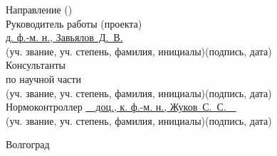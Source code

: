 \begin{titlepage}
\begin{flushleft}
	Направление ()\\
	Руководитель работы (проекта)\\
	\underline{д. ф.-м. н., Завьялов~Д.~В.}\hfill\underline{\hspace{5cm}}\\
	\vspace{-.2cm}\hspace{.4cm}\footnotesize(уч. звание, уч. степень, фамилия, 
		инициалы)\hspace{6.5cm}(подпись, дата)\normalsize\\
	Консультанты\\
	по научной части \underline{\hspace{7cm}}\hfill\underline{\hspace{5cm}}\\
	\vspace{-.2cm}\hspace{4cm}\footnotesize(уч. звание, уч. степень, фамилия, 
		инициалы)\hspace{3cm}(подпись, дата)\normalsize\\
	Нормоконтроллер \underline{\ \ доц., к. ф.-м. н., Жуков~С.~С.\ \ }\hfill
		\underline{\hspace{5cm}}\\
	\vspace{-.2cm}\hspace{4cm}\footnotesize(уч. звание, уч. степень, фамилия, 
		инициалы)\hspace{3cm}(подпись, дата)\normalsize\\
\end{flushleft}
\vspace{\fill}
\begin{center}
	Волгоград \the\year
\end{center}
\end{titlepage}


